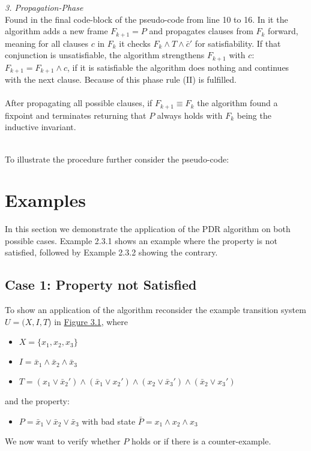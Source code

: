 \documentclass[11pt, a4paper, BCOR=10mm, ngerman]{scrbook}
\begin{document}
\textsl{3. Propagation-Phase}\\ Found in the final code-block of the pseudo-code from line 10 to 16. In it the algorithm adds a new frame $F_{k + 1} = P$ and propagates clauses from $F_{k}$ forward, meaning for all clauses $c$ in $F_{k}$ it checks $F_{k} \land T \land \bar c'$ for satisfiability. If that conjunction is unsatisfiable, the algorithm strengthens $F_{k+1}$ with $c$: $F_{k+1} = F_{k+1} \land c$, if it is satisfiable the algorithm does nothing and continues with the next clause. Because of this phase rule (II) is fulfilled.\\ \\
After propagating all possible clauses, if $F_{k+1} \equiv F_{k}$ the algorithm found a fixpoint and terminates returning that $P$ always holds with $F_k$ being the inductive invariant. \\ \\

\pagebreak

To illustrate the procedure further consider the pseudo-code: \\


\section{Examples}

In this section we demonstrate the application of the PDR algorithm on both possible cases. Example 2.3.1 shows an example where the property is not satisfied, followed by Example 2.3.2 showing the contrary.
 
\subsection{Case 1: Property not Satisfied} 
To show an application of the algorithm reconsider the example transition system $U = (X, I, T$) in \hyperref[ex1]{Figure 3.1}, where \par
\begin{itemize}
\item $X = \{x_1, x_2, x_3\}$
\item $I = \bar x_1 \land \bar x_2 \land \bar x_3$
\item $T = (x_1 \lor \bar x_2' ) \land ( \bar x_1 \lor x_2') \land (x_2 \lor \bar x_3') \land ( \bar x_2 \lor x_3')$
\end{itemize}
and the property: 
\begin{itemize}
\item $P = \bar x_1 \lor \bar x_2 \lor \bar x_3$ with bad state $\bar P = x_1 \land x_2 \land x_3$ 
\end{itemize}
We now want to verify whether $P$ holds or if there is a counter-example. \\ \\
\end{document}
